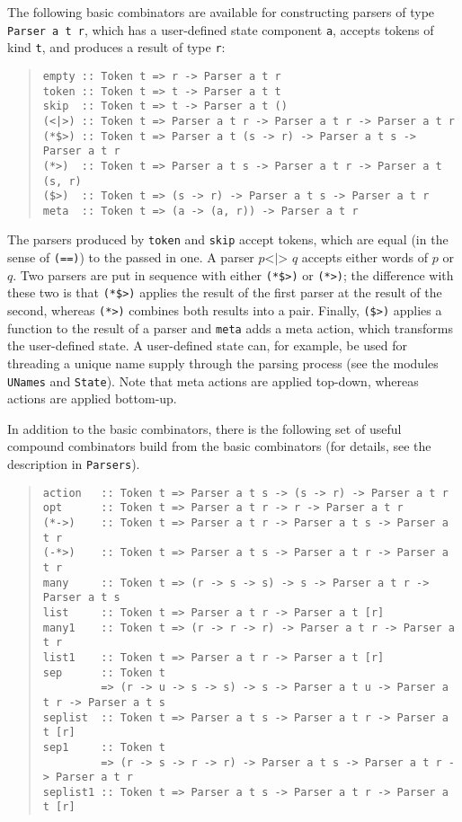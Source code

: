 \documentclass{report}
\newcommand{\code}[1]{\texttt{#1}}
\begin{document}
The following basic combinators are available for constructing parsers of type
\code{Parser a t r}, which has a user-defined state component \code{a},
accepts tokens of kind \code{t}, and produces a result of type \code{r}:
%
\begin{quote}
\begin{verbatim}
empty :: Token t => r -> Parser a t r
token :: Token t => t -> Parser a t t
skip  :: Token t => t -> Parser a t ()
(<|>) :: Token t => Parser a t r -> Parser a t r -> Parser a t r
(*$>) :: Token t => Parser a t (s -> r) -> Parser a t s -> Parser a t r
(*>)  :: Token t => Parser a t s -> Parser a t r -> Parser a t (s, r)
($>)  :: Token t => (s -> r) -> Parser a t s -> Parser a t r
meta  :: Token t => (a -> (a, r)) -> Parser a t r
\end{verbatim}
\end{quote}
%
The parsers produced by \code{token} and \code{skip} accept tokens, which are
equal (in the sense of \code{(==)}) to the passed in one.  A parser \(p\code{
  <|> }q\) accepts either words of $p$ or $q$.  Two parsers are put in
sequence with either \code{(*\$>)} or \code{(*>)}; the difference with these
two is that \code{(*\$>)} applies the result of the first parser at the result
of the second, whereas \code{(*>)} combines both results into a pair.  Finally,
\code{(\$>)} applies a function to the result of a parser and \code{meta} adds
a meta action, which transforms the user-defined state.  A user-defined state
can, for example, be used for threading a unique name supply through the
parsing process (see the modules \code{UNames} and \code{State}).  Note that
meta actions are applied top-down, whereas actions are applied bottom-up.

In addition to the basic combinators, there is the following set of useful
compound combinators build from the basic combinators (for details, see the
description in \code{Parsers}).
%
\begin{quote}
\begin{verbatim}
action   :: Token t => Parser a t s -> (s -> r) -> Parser a t r
opt      :: Token t => Parser a t r -> r -> Parser a t r
(*->)    :: Token t => Parser a t r -> Parser a t s -> Parser a t r
(-*>)    :: Token t => Parser a t s -> Parser a t r -> Parser a t r
many     :: Token t => (r -> s -> s) -> s -> Parser a t r -> Parser a t s
list     :: Token t => Parser a t r -> Parser a t [r]
many1    :: Token t => (r -> r -> r) -> Parser a t r -> Parser a t r
list1    :: Token t => Parser a t r -> Parser a t [r]
sep      :: Token t 
         => (r -> u -> s -> s) -> s -> Parser a t u -> Parser a t r -> Parser a t s
seplist  :: Token t => Parser a t s -> Parser a t r -> Parser a t [r]
sep1     :: Token t 
         => (r -> s -> r -> r) -> Parser a t s -> Parser a t r -> Parser a t r
seplist1 :: Token t => Parser a t s -> Parser a t r -> Parser a t [r]
\end{verbatim}
\end{quote}
\end{document}
